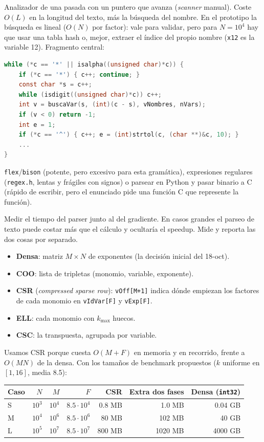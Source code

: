 \como Analizador de una pasada con un puntero que avanza (\emph{scanner} manual). Coste $O(L)$ en la longitud del texto, más la búsqueda del nombre. En el prototipo la búsqueda es lineal ($O(N)$ por factor): vale para validar, pero para $N=10^4$ hay que usar una tabla hash o, mejor, extraer el índice del propio nombre (\texttt{x12} es la variable 12). Fragmento central:
\begin{lstlisting}[language=C]
while (*c == '*' || isalpha((unsigned char)*c)) {
    if (*c == '*') { c++; continue; }
    const char *s = c++;
    while (isdigit((unsigned char)*c)) c++;
    int v = buscaVar(s, (int)(c - s), vNombres, nVars);
    if (v < 0) return -1;
    int e = 1;
    if (*c == '^') { c++; e = (int)strtol(c, (char **)&c, 10); }
    ...
}
\end{lstlisting}

\alt \texttt{flex}/\texttt{bison} (potente, pero excesivo para esta gramática), expresiones regulares (\texttt{regex.h}, lentas y frágiles con signos) o parsear en Python y pasar binario a C (rápido de escribir, pero el enunciado pide una función C que represente la función).

\begin{trampa}
Medir el tiempo del parser junto al del gradiente. En casos grandes el parseo de texto puede costar más que el cálculo y ocultaría el speedup. Mide y reporta las dos cosas por separado.
\end{trampa}

\que
\begin{itemize}
\item \textbf{Densa}: matriz $M\times N$ de exponentes (la decisión inicial del 18-oct).
\item \textbf{COO}: lista de tripletas (monomio, variable, exponente).
\item \textbf{CSR} (\emph{compressed sparse row}): \texttt{vOff[M+1]} indica dónde empiezan los factores de cada monomio en \texttt{vIdVar[F]} y \texttt{vExp[F]}.
\item \textbf{ELL}: cada monomio con $k_{\max}$ huecos.
\item \textbf{CSC}: la transpuesta, agrupada por variable.
\end{itemize}

\porque Usamos CSR porque cuesta $O(M+F)$ en memoria y en recorrido, frente a $O(MN)$ de la densa. Con los tamaños de benchmark propuestos ($k$ uniforme en $[1,16]$, media 8.5):

\begin{center}\small
\begin{tabular}{@{}lrrrrrr@{}}
\toprule
Caso & $N$ & $M$ & $F$ & CSR & Extra dos fases & Densa (\texttt{int32}) \\
\midrule
S & $10^3$ & $10^4$ & $8.5\cdot10^4$ & 0.8 MB & 1.0 MB & 0.04 GB \\
M & $10^4$ & $10^6$ & $8.5\cdot10^6$ & 80 MB & 102 MB & 40 GB \\
L & $10^5$ & $10^7$ & $8.5\cdot10^7$ & 800 MB & 1020 MB & 4000 GB \\
\bottomrule
\end{tabular}
\end{center}

